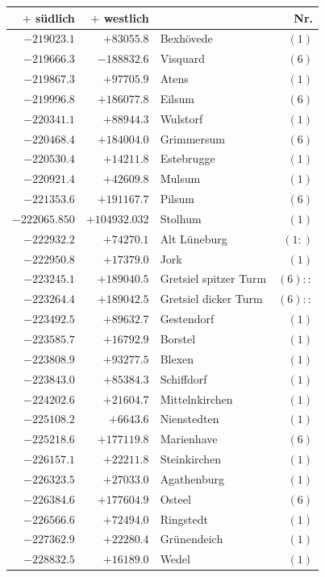 \begin{center}\begingroup\fontsize{8}{9}\selectfont
\setlength{\tabcolsep}{4pt}
\begin{tabular}{r|r|p{170pt}|r}\hline
\(+\) südlich&\(+\) westlich&&Nr.\\\hline
\(-219023.1\)&\(+83055.8\)&Bexhövede&\((1)\)\\
\(-219666.3\)&\(-188832.6\)&Visquard&\((6)\)\\
\(-219867.3\)&\(+97705.9\)&Atens&\((1)\)\\
\(-219996.8\)&\(+186077.8\)&Eilsum&\((6)\)\\
\(-220341.1\)&\(+88944.3\)&Wulstorf&\((1)\)\\
\(-220468.4\)&\(+184004.0\)&Grimmersum&\((6)\)\\
\(-220530.4\)&\(+14211.8\)&Estebrugge&\((1)\)\\
\(-220921.4\)&\(+42609.8\)&Mulsum&\((1)\)\\
\(-221353.6\)&\(+191167.7\)&Pilsum&\((6)\)\\
\(-222065.850\)&\(+104932.032\)&Stolhum&\((1)\)\\
\(-222932.2\)&\(+74270.1\)&Alt Lüneburg&\((1:)\)\\
\(-222950.8\)&\(+17379.0\)&Jork&\((1)\)\\
\(-223245.1\)&\(+189040.5\)&Gretsiel spitzer Turm&\((6)::\)\\
\(-223264.4\)&\(+189042.5\)&Gretsiel dicker Turm&\((6)::\)\\
\(-223492.5\)&\(+89632.7\)&Gestendorf&\((1)\)\\
\(-223585.7\)&\(+16792.9\)&Borstel&\((1)\)\\
\(-223808.9\)&\(+93277.5\)&Blexen&\((1)\)\\
\(-223843.0\)&\(+85384.3\)&Schiffdorf&\((1)\)\\
\(-224202.6\)&\(+21604.7\)&Mittelnkirchen&\((1)\)\\
\(-225108.2\)&\(+6643.6\)&Nienstedten&\((1)\)\\
\(-225218.6\)&\(+177119.8\)&Marienhave&\((6)\)\\
\(-226157.1\)&\(+22211.8\)&Steinkirchen&\((1)\)\\
\(-226323.5\)&\(+27033.0\)&Agathenburg&\((1)\)\\
\(-226384.6\)&\(+177604.9\)&Osteel&\((6)\)\\
\(-226566.6\)&\(+72494.0\)&Ringstedt&\((1)\)\\
\(-227362.9\)&\(+22280.4\)&Grünendeich&\((1)\)\\
\(-228832.5\)&\(+16189.0\)&Wedel&\((1)\)\\

\end{tabular}
\end{center}

